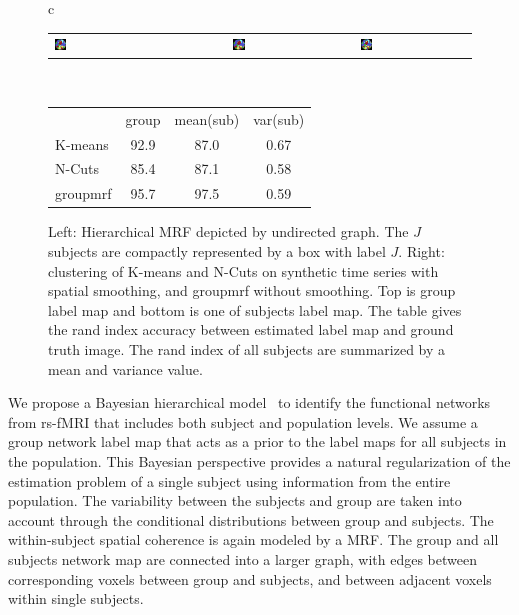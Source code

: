 \documentclass[12pt]{article}
\begin{document}
\begin{figure}[htb]
\begin{tabular}[b]{c}
\begin{tabular}[b]{lccccc}
      \includegraphics[width=0.1\textwidth]{figure1/kmeans_sub1} &
      \includegraphics[width=0.1\textwidth]{figure1/ncuts_sub1} &
      \includegraphics[width=0.1\textwidth]{figure1/mrf_sub1} \\
    \end{tabular} \\
    \hspace{15pt}
    \footnotesize
    \begin{tabular}[b]{l|ccc}
      & group & mean(sub) & var(sub) \\
      \textsf{K-means} & 92.9 & 87.0 & 0.67\\
      \textsf{N-Cuts} & 85.4 & 87.1 & 0.58 \\
      \textsf{groupmrf} & 95.7 & 97.5 & 0.59
    \end{tabular}
  \end{tabular}
  \caption{Left: Hierarchical MRF depicted by undirected graph. The $J$ subjects
    are compactly represented by a box with label $J$. Right: clustering of
    \textsf{K-means} and \textsf{N-Cuts} on synthetic time series with spatial
    smoothing, and \textsf{groupmrf} without smoothing. Top is group label map
    and bottom is one of subjects label map. The table gives the rand index accuracy
    between estimated label map and ground truth image. The rand index of all
    subjects are summarized by a mean and variance value.}
  \label{fig:fig1}
\vspace*{-8pt}
\end{figure}

We propose a Bayesian hierarchical model~\cite{Liu2012a} to identify the
functional networks from rs-fMRI that includes both subject and population
levels. We assume a group network label map that acts as a prior to the label
maps for all subjects in the population. This Bayesian perspective provides a
natural regularization of the estimation problem of a single subject using
information from the entire population. The variability between the subjects and
group are taken into account through the conditional distributions between group
and subjects. The within-subject spatial coherence is again modeled by a
MRF. The group and all subjects network map are connected into a larger graph,
with edges between corresponding voxels between group and subjects, and between
adjacent voxels within single subjects.
\end{document}

